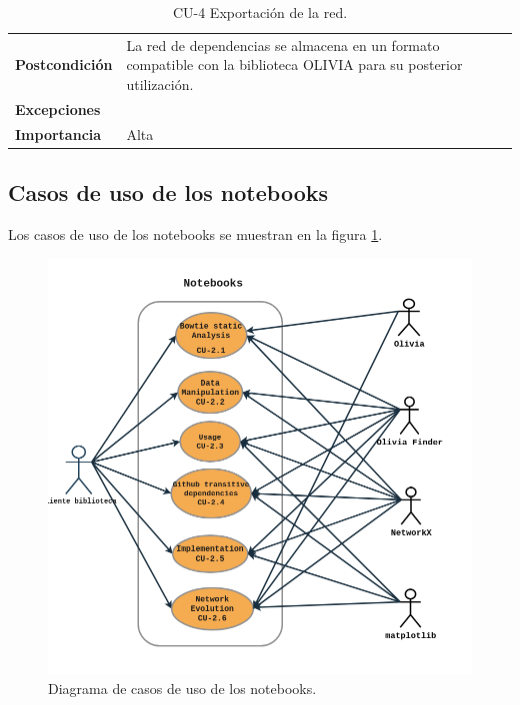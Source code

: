 \begin{table}[p]
\begin{tabularx}{\linewidth}{ p{} p{} }
		\textbf{Postcondición}        & La red de dependencias se almacena en un formato compatible con la biblioteca OLIVIA para su posterior utilización.                              \\
		\textbf{Excepciones}          &                                                                                                                                                  \\
		\textbf{Importancia}          & Alta                                                                                                                                             \\
		\bottomrule
	\end{tabularx}
	\caption{CU-4 Exportación de la red.}
	\label{tab:cu4}
\end{table}


\subsection{Casos de uso de los notebooks}

Los casos de uso de los notebooks se muestran en la figura \ref{fig:casos_de_uso_notebooks}.


\begin{figure}[h]
	\centering
	\includegraphics[width=1\textwidth]{img/anexos/CU_notebooks.png}
	\caption{Diagrama de casos de uso de los notebooks.}
	\label{fig:casos_de_uso_notebooks}
\end{figure}

